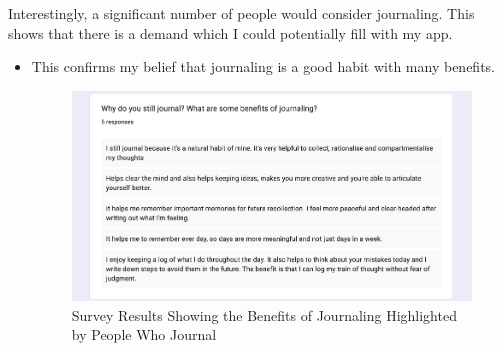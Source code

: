 Interestingly, a significant number of people would consider journaling. This shows that there is a demand which I could potentially fill with my app.


\newpage
\setcounter{question}{0}
\begin{itemize}
  \answer{}
  "I overthink too much"

  "Was more of a note taking thing I used to do then it evolved into writing - not all the time, but on occasion"

  "Having a busy period in my life where so much was going on that I realised that I wanted to remember as much of it as possible. However, I wasn't certain that I'd be able to recall everything on my own, so I wrote things down as they happened to ensure that I wouldn't forget them."

  "I was walking across the river Thames one day and I sat down for 30 minutes and just stared as the river flowed extremely peacefully. I found so many thoughts racing through my head and got restless without any digital media to entertain me. This experience inspired me to have that peace of mind and articulate my thoughts."


  \item This confirms my belief that journaling is a good habit with many benefits. 

  \begin{figure}[H]
    \includegraphics[width=\textwidth]{Assets/survey_benefits_journals.png}
    \caption{Survey Results Showing the Benefits of Journaling Highlighted by People Who Journal}
  \end{figure}


\end{itemize}

